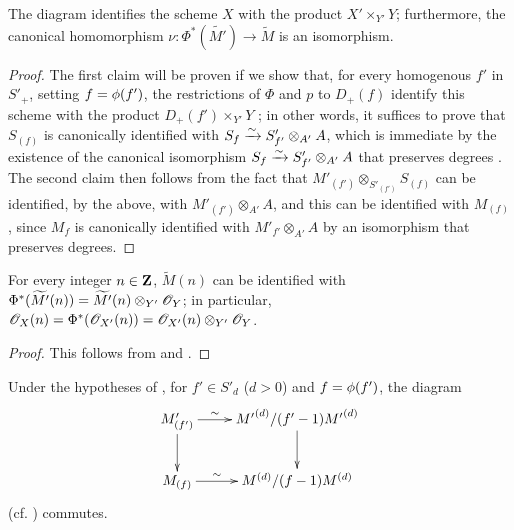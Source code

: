\begin{proposition}[2.8.10]
\label{II.2.8.10}
The diagram  identifies the scheme $X$ with the product $X'\times_{Y'}Y$;
furthermore, the canonical homomorphism $\nu:\Phi^*(\widetilde{M'})\to\widetilde{M}$  is an isomorphism.
\end{proposition}

\begin{proof}
The first claim will be proven if we show that, for every homogenous $f'$ in $S'_+$, setting $f=\phi(f')$, the restrictions of $\Phi$ and $p$ to $D_+(f)$ identify this scheme with the product $D_+(f')\times_{Y'}Y$ ;
in other words, it suffices  to prove that $S_{(f)}$ is canonically identified with $S_f\xrightarrow{\sim} S'_{f'}\otimes_{A'}A$, which is immediate by the existence of the canonical isomorphism $S_f\xrightarrow{\sim} S'_{f'}\otimes_{A'}A$ that preserves degrees .
The second claim then follows from the fact that $M'_{(f')}\otimes_{S'_{(f')}}S_{(f)}$ can be identified, by the above, with $M'_{(f')}\otimes_{A'}A$, and this can be identified with $M_{(f)}$, since $M_f$ is canonically identified with $M'_{f'}\otimes_{A'}A$ by an isomorphism that preserves degrees.
\end{proof}

\begin{corollary}[2.8.11]
\label{II.2.8.11}
For every integer $n\in\mathbf{Z}$, $\widetilde{M}(n)$ can be identified with $\Phi^*(\widetilde{M'}(n))=\widetilde{M'}(n)\otimes_{Y'}\mathscr{O}_Y$;
in particular, $\mathscr{O}_X(n)=\Phi^*(\mathscr{O}_{X'}(n))=\mathscr{O}_{X'}(n)\otimes_{Y'}\mathscr{O}_Y$.
\end{corollary}

\begin{proof}
This follows from  and .
\end{proof}


\begin{env}[2.8.12]
\label{II.2.8.12}
Under the hypotheses of , for $f'\in S'_d$ ($d>0$) and $f=\phi(f')$, the diagram
\[
  \xymatrix{
    M'_{(f')} \ar[r]^-{\sim} \ar[d]
    & {M'}^{(d)}/(f'-1){M'}^{(d)} \ar[d]
  \\M_{(f)} \ar[r]^-{\sim}
    & M^{(d)}/(f-1)M^{(d)}
  }
\]
(cf. ) commutes.
\end{env}

